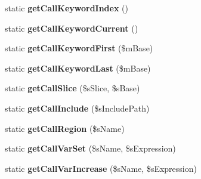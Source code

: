 \begin{DoxyCompactItemize}
\item 
\hypertarget{class_i_p_c_o___parser_settings_aa7f8a086f1dd169bdf32f3d9f1eeb2c9}{static {\bfseries get\-Call\-Keyword\-Index} ()}\label{class_i_p_c_o___parser_settings_aa7f8a086f1dd169bdf32f3d9f1eeb2c9}

\item 
\hypertarget{class_i_p_c_o___parser_settings_a8ee88b41d2bb3953ee6884c50d53402c}{static {\bfseries get\-Call\-Keyword\-Current} ()}\label{class_i_p_c_o___parser_settings_a8ee88b41d2bb3953ee6884c50d53402c}

\item 
\hypertarget{class_i_p_c_o___parser_settings_affdc26d432fedf0ac5e43587b76350ae}{static {\bfseries get\-Call\-Keyword\-First} (\$m\-Base)}\label{class_i_p_c_o___parser_settings_affdc26d432fedf0ac5e43587b76350ae}

\item 
\hypertarget{class_i_p_c_o___parser_settings_a12f765c7d9136ba13c9de3f9f838f039}{static {\bfseries get\-Call\-Keyword\-Last} (\$m\-Base)}\label{class_i_p_c_o___parser_settings_a12f765c7d9136ba13c9de3f9f838f039}

\item 
\hypertarget{class_i_p_c_o___parser_settings_af446f09b24f512c9cd72192711e2ef91}{static {\bfseries get\-Call\-Slice} (\$s\-Slice, \$s\-Base)}\label{class_i_p_c_o___parser_settings_af446f09b24f512c9cd72192711e2ef91}

\item 
\hypertarget{class_i_p_c_o___parser_settings_a03bc5b7b4496ca9d09309bc94fb945ee}{static {\bfseries get\-Call\-Include} (\$s\-Include\-Path)}\label{class_i_p_c_o___parser_settings_a03bc5b7b4496ca9d09309bc94fb945ee}

\item 
\hypertarget{class_i_p_c_o___parser_settings_a87345b9f4d35406d5b0b13df6923bd07}{static {\bfseries get\-Call\-Region} (\$s\-Name)}\label{class_i_p_c_o___parser_settings_a87345b9f4d35406d5b0b13df6923bd07}

\item 
\hypertarget{class_i_p_c_o___parser_settings_aaf02bcf5af9ee0c8bca95a6b294a56d3}{static {\bfseries get\-Call\-Var\-Set} (\$s\-Name, \$s\-Expression)}\label{class_i_p_c_o___parser_settings_aaf02bcf5af9ee0c8bca95a6b294a56d3}

\item 
\hypertarget{class_i_p_c_o___parser_settings_ab6005fa74d201c4637a1799881b7d481}{static {\bfseries get\-Call\-Var\-Increase} (\$s\-Name, \$s\-Expression)}\label{class_i_p_c_o___parser_settings_ab6005fa74d201c4637a1799881b7d481}


\end{DoxyCompactItemize}
